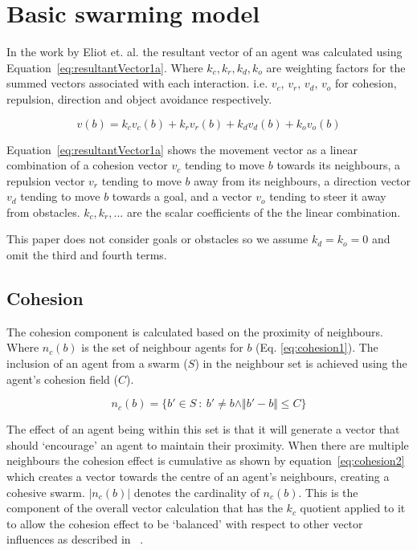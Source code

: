 \documentclass[12pt,a4paper]{IEEEtran}
\newcommand{\magn}[1]{\Vert{#1}\Vert}
\newcommand{\card}[1]{\vert{#1}\vert}
\newcommand{\vbb}[2]{#2-#1}
\newcommand{\kc}{\mathit{k_{c}}}
\newcommand{\kr}{\mathit{k_{r}}}
\newcommand{\kd}{\mathit{k_{d}}}
\newcommand{\ko}{\mathit{k_{o}}}
\begin{document}
\section{Basic swarming model}\label{sec:basicModel}
In the work by Eliot et. al. the resultant vector of an agent was calculated using Equation~\ref{eq:resultantVector1a}. Where $\kc, \kr, k_d, k_o$ are weighting factors for the summed vectors associated with each interaction. i.e. $v_c$, $v_r$, $v_d$, $v_o$ for cohesion, repulsion, direction and object avoidance respectively. 

\begin{equation}\label{eq:resultantVector1a}
	v(b) = \kc v_c(b) + \kr v_r(b) + \kd v_d(b) + \ko v_o(b)
\end{equation}

Equation~\ref{eq:resultantVector1a} shows the movement vector as a linear combination of a cohesion vector $v_c$ tending to move $b$ towards its neighbours, a repulsion vector $v_r$ tending to move $b$ away from its neighbours, a direction vector  $v_d$ tending to move $b$ towards a goal, and a vector $v_o$ tending to steer it away from obstacles. $\kc, \kr, ...$ are the scalar coefficients of the the linear combination.

This paper does not consider goals or obstacles so we assume $\kd = \ko = 0$ and omit the third and fourth terms.

\subsection{Cohesion}\label{cohesion}
The cohesion component is calculated based on the proximity of neighbours. Where $n_c(b)$ is the set of neighbour agents for $b$ (Eq. \ref{eq:cohesion1}). The inclusion of an agent from a swarm ($S$) in the neighbour set is achieved using the agent's cohesion field ($C$).

\begin{equation}\label{eq:cohesion1}
n_c(b) = \{b' \in S~:~b' \neq b \land\magn{\vbb{b}{b'}} \leq C\}
\end{equation}

The effect of an agent being within this set is that it will generate a vector that should `encourage' an agent to maintain their proximity. When there are multiple neighbours the cohesion effect is cumulative as shown by equation~\ref{eq:cohesion2} which creates a vector towards the centre of an agent's neighbours, creating a cohesive swarm. $\card{n_c(b)}$ denotes the cardinality of $n_c(b)$. This is the component of the overall vector calculation that has the $\kc$ quotient applied to it to allow the cohesion effect to be `balanced' with respect to other vector influences as described in ~\cite{eliot2017methods,eliot2018metric,eliot2019void}. 
\end{document}
